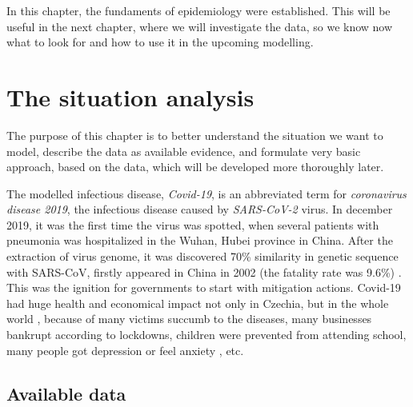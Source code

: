 \documentclass[
  digital, %
  oneside, %
  lof,     %
  lot,     %
]{fithesis4}
\begin{document}
In this chapter, the fundaments of epidemiology were established.
This will be useful in the next chapter, where we will investigate
the data, so we know now what to look for and how to use it in
the upcoming modelling.






\chapter{The situation analysis}

The purpose of this chapter is to better understand the situation 
we want to model, describe the data as available evidence, and
formulate very basic approach, based on the data, which will be 
developed more thoroughly later.

The modelled infectious disease, \textit{Covid-19}, is an abbreviated 
term for \textit{coronavirus disease 2019}, the infectious disease 
caused by \textit{SARS-CoV-2} virus. 
In december 2019, it was the first time the virus was spotted, 
when several patients with pneumonia was hospitalized in the 
Wuhan, Hubei province in China. 
After the extraction of virus genome, it was discovered 
70\% similarity in genetic sequence with SARS-CoV, 
firstly appeared in China in 2002 (the fatality rate 
was 9.6\%) \cite{hui2019}.
This was the ignition for governments to start with mitigation 
actions.
Covid-19 had huge health and economical impact not only in 
Czechia, but in the whole world \cite{maital2020}, because of many victims
succumb to the diseases, many businesses bankrupt according
to lockdowns, children were prevented from attending
school, many people got depression or feel anxiety \cite{khan2020}, etc.


\section{Available data}
\label{sec:available-data}
\end{document}
